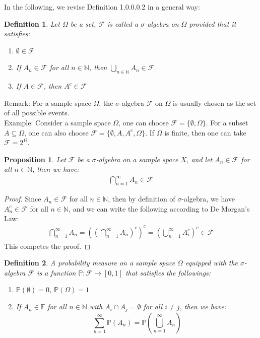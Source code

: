 \documentclass[11pt]{book}
\theoremstyle{break}
\theoremstyle{break}
\newtheorem{prop}[lem]{Proposition}
\newtheorem{defn}{Definition}[corL]
\newcommand{\N}{\mathbb{N}}
\newcommand{\remark}{\color{blue}Remark: \color{black}}
\newcommand{\example}{\color{green}Example: \color{black}}
\begin{document}
In the following, we revise Definition 1.0.0.0.2 in a general way:
\begin{defn}
Let $\Omega$ be a set, $\mathcal{F}$ is called a $\sigma$-algebra on $\Omega$ provided that it satisfies:
\begin{enumerate}[topsep=3pt,itemsep=-1ex,partopsep=1ex,parsep=1ex]
\item $\emptyset \in \mathcal{F}$
\item If $A_n \in \mathcal{F}$ for all $n \in \N$, then $\bigcup_{n\in \N}A_n \in \mathcal{F}$
\item If $A \in \mathcal{F}$, then $A^c \in \mathcal{F}$
\end{enumerate} 
\end{defn}


\remark For a sample space $\Omega$, the $\sigma$-algebra $\mathcal{F}$ on $\Omega$ is usually chosen as the set of all possible events.\\

\example Consider a sample space $\Omega$, one can choose $\mathcal{F} = \{\emptyset,\Omega\}$. For a subset $A\subseteq \Omega$, one can also choose $\mathcal{F} = \{ \emptyset, A, A^c, \Omega\}$. If $\Omega$ is finite, then one can take $\mathcal{F} = 2^\Omega$. 


\begin{prop}
Let $\mathcal{F}$ be a $\sigma$-algebra on a sample space $X$, and let $A_n \in \mathcal{F}$ for all $n \in \N$, then we have:
\begin{align*}
\bigcap_{n=1}^\infty A_n \in \mathcal{F}
\end{align*}
\end{prop}
\begin{proof}
Since $A_n \in \mathcal{F}$ for all $n \in \N$, then by definition of $\sigma$-algebra, we have $A_n^c \in \mathcal{F}$ for all $n \in \N$, and we can write the following according to De Morgan's Law:
\begin{align*}
\bigcap_{n=1}^\infty A_n = \left( \left(\bigcap_{n=1}^\infty A_n\right)^c\right)^c  = \left( \bigcup_{n=1}^\infty A_i^c\right)^c \in \mathcal{F} 
\end{align*}
This competes the proof.
\end{proof}

\begin{defn}
A probability measure on a sample space $\Omega$ equipped with the $\sigma$-algebra $\mathcal{F}$ is a function $\mathbb{P}: \mathcal{F} \to [0,1]$ that satisfies the followings:
\begin{enumerate}[topsep=3pt,itemsep=-1ex,partopsep=1ex,parsep=1ex]
\item $\mathbb{P}(\emptyset) = 0$, $\mathbb{P}(\Omega) =  1$
\item If $A_n \in \mathbb{F}$ for all $n \in \N$ with $A_i \cap A_j = \emptyset$ for all $i\neq j$, then we have: 
$$\sum_{n=1}^\infty \mathbb{P}(A_n) = \mathbb{P}\left(\bigcup_{n=1}^\infty A_n\right)$$
\end{enumerate} 
\end{defn}
\end{document}
